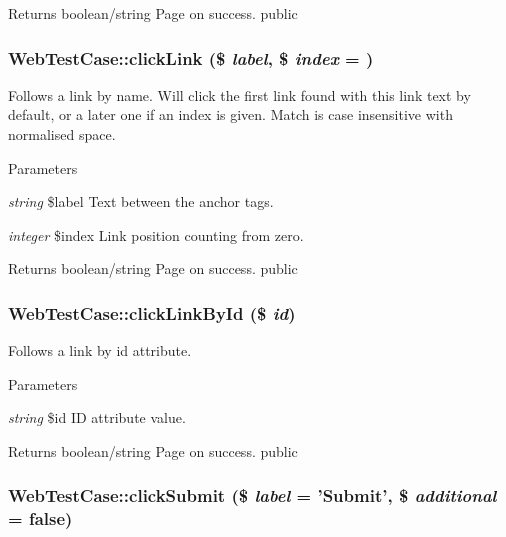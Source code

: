 \begin{DoxyReturn}{Returns}
boolean/string Page on success.  public 
\end{DoxyReturn}
\hypertarget{class_web_test_case_a286ade62f142d1ac0b5d0bc9038a01cf}{
\subsubsection[{clickLink}]{\setlength{\rightskip}{0pt plus 5cm}WebTestCase::clickLink (\$ {\em label}, \/  \$ {\em index} = {})}}
\label{class_web_test_case_a286ade62f142d1ac0b5d0bc9038a01cf}
Follows a link by name. Will click the first link found with this link text by default, or a later one if an index is given. Match is case insensitive with normalised space. 
\begin{DoxyParams}{Parameters}
\item[{\em string}]\$label Text between the anchor tags. \item[{\em integer}]\$index Link position counting from zero. \end{DoxyParams}
\begin{DoxyReturn}{Returns}
boolean/string Page on success.  public 
\end{DoxyReturn}
\hypertarget{class_web_test_case_ac87eaa5a61ab4ba0fe12deab4ddc97e2}{
\subsubsection[{clickLinkById}]{\setlength{\rightskip}{0pt plus 5cm}WebTestCase::clickLinkById (\$ {\em id})}}
\label{class_web_test_case_ac87eaa5a61ab4ba0fe12deab4ddc97e2}
Follows a link by id attribute. 
\begin{DoxyParams}{Parameters}
\item[{\em string}]\$id ID attribute value. \end{DoxyParams}
\begin{DoxyReturn}{Returns}
boolean/string Page on success.  public 
\end{DoxyReturn}
\hypertarget{class_web_test_case_a7c7a1adc6ce99397bda5914edca76eaf}{
\subsubsection[{clickSubmit}]{\setlength{\rightskip}{0pt plus 5cm}WebTestCase::clickSubmit (\$ {\em label} = {\ttfamily 'Submit'}, \/  \$ {\em additional} = {\ttfamily false})}}
